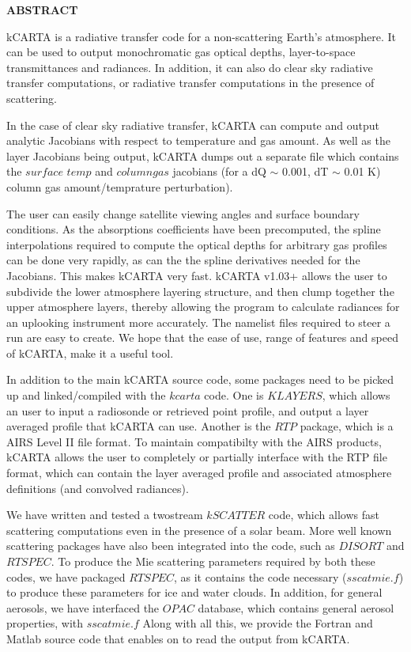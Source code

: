 \documentclass[12pt]{article}
\newcommand{\kc}{\textsf{kCARTA}\xspace}
\begin{document}
\begin{center}
{\bf ABSTRACT}
\end{center}

\kc is a radiative transfer code for a non-scattering Earth's
atmosphere.  It can be used to output monochromatic gas optical
depths, layer-to-space transmittances and radiances.  In addition, it
can also do clear sky radiative transfer computations, or radiative
transfer computations in the presence of scattering.

In the case of clear sky radiative transfer, \kc can compute and output 
analytic Jacobians with respect to temperature and gas amount.  As well
as the layer Jacobians being output, \kc dumps out a separate file which
contains the $surface$ $temp$ and $column gas$ jacobians (for a dQ $\sim$ 0.001, dT $\sim$ 0.01 K) 
column gas amount/temprature perturbation).

The user can easily change satellite viewing angles
and surface boundary conditions.  As the absorptions coefficients have
been precomputed, the spline interpolations required to compute the
optical depths for arbitrary gas profiles can be done very rapidly, as
can the the spline derivatives needed for the Jacobians.  This makes
\kc very fast.  \kc v1.03+ allows the user to subdivide the lower atmosphere 
layering structure, and then clump together the upper atmosphere layers, 
thereby allowing the program to calculate radiances
for an uplooking instrument more accurately. The namelist files required to 
steer a run are easy to create.  We hope that the ease of use, range of 
features and speed of \kc, make it a useful tool.

In addition to the main \kc source code, some packages need to be picked up
and linked/compiled with the $kcarta$ code. One is $KLAYERS$, which allows an 
user to input a radiosonde or retrieved point profile, and output a layer 
averaged profile that \kc can use. Another is the $RTP$ package, which is a 
AIRS Level II file format. To maintain compatibilty with the AIRS products, 
\kc allows the user to completely or partially interface with the RTP file 
format, which can contain the layer averaged profile and associated 
atmosphere definitions (and convolved radiances). 

We have written and tested a twostream $kSCATTER$ code, which allows fast 
scattering
computations even in the presence of a solar beam. More well known scattering
packages have also been integrated into the code, such as $DISORT$ and 
$RTSPEC$. To produce the Mie scattering parameters required
by both these codes, we have packaged $RTSPEC$, as it contains the code 
necessary ($sscatmie.f$) to produce these parameters for ice and water clouds. 
In addition, for general aerosols, we have interfaced the $OPAC$ database, 
which contains general aerosol properties, with $sscatmie.f$ Along with all 
this, we provide the Fortran and Matlab source code that enables on to read
the output from \kc.
\end{document}
